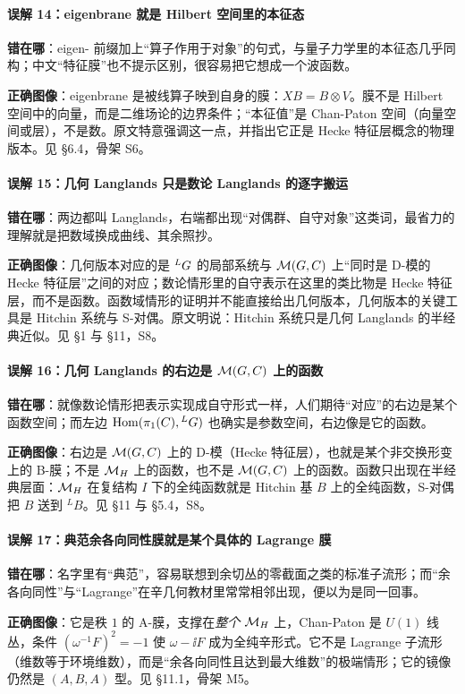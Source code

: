 \paragraph{误解 14：eigenbrane 就是 Hilbert 空间里的本征态}
\mbox{}\par\noindent
\textbf{错在哪}：eigen- 前缀加上“算子作用于对象”的句式，与量子力学里的本征态几乎同构；中文“特征膜”也不提示区别，很容易把它想成一个波函数。
\par\noindent
\textbf{正确图像}：eigenbrane 是被线算子映到自身的膜：$XB=B\otimes V$。膜不是 Hilbert 空间中的向量，而是二维场论的边界条件；“本征值”是 Chan-Paton 空间（向量空间或层），不是数。原文特意强调这一点，并指出它正是 Hecke 特征层概念的物理版本。见 \S6.4，骨架 S6。

\paragraph{误解 15：几何 Langlands 只是数论 Langlands 的逐字搬运}
\mbox{}\par\noindent
\textbf{错在哪}：两边都叫 Langlands，右端都出现“对偶群、自守对象”这类词，最省力的理解就是把数域换成曲线、其余照抄。
\par\noindent
\textbf{正确图像}：几何版本对应的是 ${}^{L}G$ 的局部系统与 $\mathcal{M}(G,C)$ 上“同时是 D-模的 Hecke 特征层”之间的对应；数论情形里的自守表示在这里的类比物是 Hecke 特征层，而不是函数。函数域情形的证明并不能直接给出几何版本，几何版本的关键工具是 Hitchin 系统与 S-对偶。原文明说：Hitchin 系统只是几何 Langlands 的半经典近似。见 \S1 与 \S11，S8。

\paragraph{误解 16：几何 Langlands 的右边是 $\mathcal{M}(G,C)$ 上的函数}
\mbox{}\par\noindent
\textbf{错在哪}：就像数论情形把表示实现成自守形式一样，人们期待“对应”的右边是某个函数空间；而左边 $\mathrm{Hom}(\pi_1(C),{}^{L}G)$ 也确实是参数空间，右边像是它的函数。
\par\noindent
\textbf{正确图像}：右边是 $\mathcal{M}(G,C)$ 上的 D-模（Hecke 特征层），也就是某个非交换形变上的 B-膜；不是 $\mathcal{M}_H$ 上的函数，也不是 $\mathcal{M}(G,C)$ 上的函数。函数只出现在半经典层面：$\mathcal{M}_H$ 在复结构 $I$ 下的全纯函数就是 Hitchin 基 $B$ 上的全纯函数，S-对偶把 $B$ 送到 ${}^LB$。见 \S11 与 \S5.4，S8。

\paragraph{误解 17：典范余各向同性膜就是某个具体的 Lagrange 膜}
\mbox{}\par\noindent
\textbf{错在哪}：名字里有“典范”，容易联想到余切丛的零截面之类的标准子流形；而“余各向同性”与“Lagrange”在辛几何教材里常常相邻出现，便以为是同一回事。
\par\noindent
\textbf{正确图像}：它是秩 $1$ 的 A-膜，支撑在\emph{整个} $\mathcal{M}_H$ 上，Chan-Paton 是 $U(1)$ 线丛，条件 $(\omega^{-1}F)^2=-1$ 使 $\omega-\ii F$ 成为全纯辛形式。它不是 Lagrange 子流形（维数等于环境维数），而是“余各向同性且达到最大维数”的极端情形；它的镜像仍然是 $(A,B,A)$ 型。见 \S11.1，骨架 M5。

